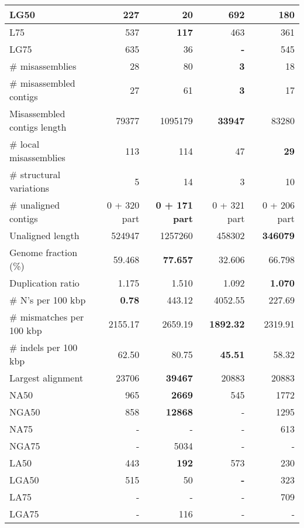 \documentclass[12pt,a4paper]{article}
\begin{document}
\begin{table}[ht]
\begin{center}
\begin{tabular}{|l*{4}{|r}|}
LG50 & 227 & {\bf 20} & 692 & 180 \\ \hline
L75 & 537 & {\bf 117} & 463 & 361 \\ \hline
LG75 & 635 & 36 & {\bf -} & 545 \\ \hline
\# misassemblies & 28 & 80 & {\bf 3} & 18 \\ \hline
\# misassembled contigs & 27 & 61 & {\bf 3} & 17 \\ \hline
Misassembled contigs length & 79377 & 1095179 & {\bf 33947} & 83280 \\ \hline
\# local misassemblies & 113 & 114 & 47 & {\bf 29} \\ \hline
\# structural variations & 5 & 14 & 3 & 10 \\ \hline
\# unaligned contigs & 0 + 320 part & {\bf 0 + 171 part} & 0 + 321 part & 0 + 206 part \\ \hline
Unaligned length & 524947 & 1257260 & 458302 & {\bf 346079} \\ \hline
Genome fraction (\%) & 59.468 & {\bf 77.657} & 32.606 & 66.798 \\ \hline
Duplication ratio & 1.175 & 1.510 & 1.092 & {\bf 1.070} \\ \hline
\# N's per 100 kbp & {\bf 0.78} & 443.12 & 4052.55 & 227.69 \\ \hline
\# mismatches per 100 kbp & 2155.17 & 2659.19 & {\bf 1892.32} & 2319.91 \\ \hline
\# indels per 100 kbp & 62.50 & 80.75 & {\bf 45.51} & 58.32 \\ \hline
Largest alignment & 23706 & {\bf 39467} & 20883 & 20883 \\ \hline
NA50 & 965 & {\bf 2669} & 545 & 1772 \\ \hline
NGA50 & 858 & {\bf 12868} & - & 1295 \\ \hline
NA75 & - & - & - & 613 \\ \hline
NGA75 & - & 5034 & - & - \\ \hline
LA50 & 443 & {\bf 192} & 573 & 230 \\ \hline
LGA50 & 515 & 50 & {\bf -} & 323 \\ \hline
LA75 & - & - & - & 709 \\ \hline
LGA75 & - & 116 & - & - \\ \hline
\end{tabular}
\end{center}
\end{table}
\end{document}
